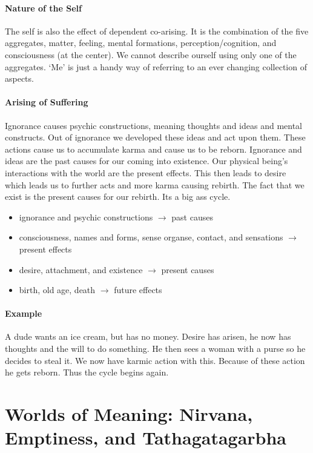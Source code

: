 \documentclass{article}
\begin{document}
\paragraph{Nature of the Self}
\label{par:nature_of_the_self}
The self is also the effect of dependent co-arising. It is the combination of the five aggregates, matter, feeling, mental formations, perception/cognition, and consciousness (at the center). We cannot describe ourself using only one of the aggregates. `Me' is just a handy way of referring to an ever changing collection of aspects.

\paragraph{Arising of Suffering}
\label{par:arising_of_suffering}
Ignorance causes psychic constructions, meaning thoughts and ideas and mental constructs. Out of ignorance we developed these ideas and act upon them. These actions cause us to accumulate karma and cause us to be reborn. Ignorance and ideas are the past causes for our coming into existence. Our physical being's interactions with the world are the present effects. This then leads to desire which leads us to further acts and more karma causing rebirth. The fact that we exist is the present causes for our rebirth. Its a big ass cycle.

\begin{itemize}
	\item ignorance and psychic constructions $\rightarrow$ past causes
	\item consciousness, names and forms, sense organse, contact, and sensations $\rightarrow$ present effects
	\item desire, attachment, and existence $\rightarrow$ present causes
	\item birth, old age, death $\rightarrow$ future effects
\end{itemize}

\paragraph{Example}
\label{par:example}
A dude wants an ice cream, but has no money. Desire has arisen, he now has thoughts and the will to do something. He then sees a woman with a purse so he decides to steal it. We now have karmic action with this. Because of these action he gets reborn. Thus the cycle begins again.

\section*{Worlds of Meaning: Nirvana, Emptiness, and Tathagatagarbha}
\label{sec:worlds_of_meaning_nirvana_emptiness_and_tathagatagarbha}
\end{document}
